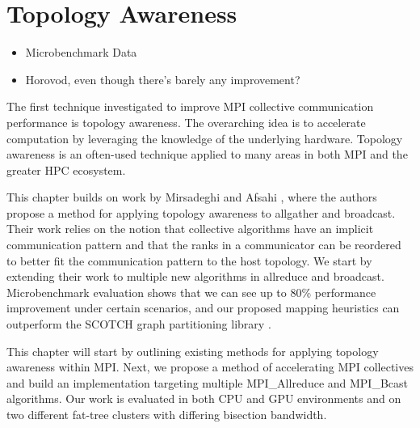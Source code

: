 
\glsresetall %
\chapter[Topology]{Topology Awareness}\label{ch:TopologyAwareness}


\begin{itemize}
    \item Microbenchmark Data
    \item Horovod, even though there's barely any improvement?
\end{itemize}

The first technique investigated to improve MPI collective communication performance is topology awareness.
The overarching idea is to accelerate computation by leveraging the knowledge of the underlying hardware.
Topology awareness is an often-used technique applied to many areas in both MPI and the greater HPC ecosystem.

This chapter builds on work by Mirsadeghi and Afsahi \cite{Mirsadeghi2016TopoAwareCollRR}, where the authors propose a method for applying topology awareness to allgather and broadcast.
Their work relies on the notion that collective algorithms have an implicit communication pattern and that the ranks in a communicator can be reordered to better fit the communication pattern to the host topology.
We start by extending their work to multiple new algorithms in allreduce and broadcast.
Microbenchmark evaluation shows that we can see up to 80\% performance improvement under certain scenarios, and our proposed mapping heuristics can outperform the SCOTCH graph partitioning library \cite{Pellegrini2012SCOTCH}.

This chapter will start by outlining existing methods for applying topology awareness within MPI.
Next, we propose a method of accelerating MPI collectives and build an implementation targeting multiple MPI\_Allreduce and MPI\_Bcast algorithms.
Our work is evaluated in both CPU and GPU environments and on two different fat-tree clusters with differing bisection bandwidth.

